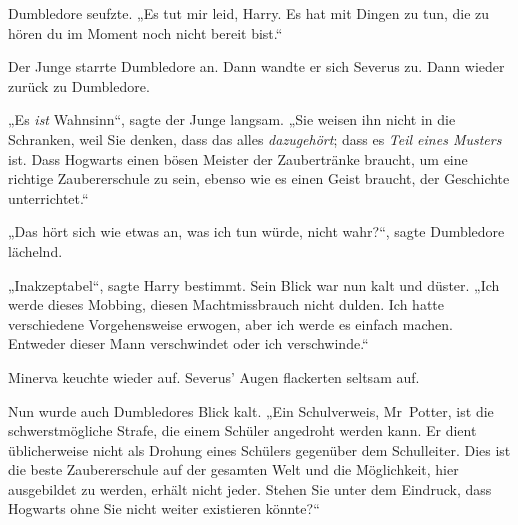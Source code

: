 Dumbledore seufzte. „Es tut mir leid, Harry. Es hat mit Dingen zu tun, die zu hören du im Moment noch nicht bereit bist.“

Der Junge starrte Dumbledore an. Dann wandte er sich Severus zu. Dann wieder zurück zu Dumbledore.

„Es \emph{ist} Wahnsinn“, sagte der Junge langsam. „Sie weisen ihn nicht in die Schranken, weil Sie denken, dass das alles \emph{dazugehört}; dass es \emph{Teil eines Musters} ist. Dass Hogwarts einen bösen Meister der Zaubertränke braucht, um eine richtige Zaubererschule zu sein, ebenso wie es einen Geist braucht, der Geschichte unterrichtet.“

„Das hört sich wie etwas an, was ich tun würde, nicht wahr?“, sagte Dumbledore lächelnd.

„Inakzeptabel“, sagte Harry bestimmt. Sein Blick war nun kalt und düster. „Ich werde dieses Mobbing, diesen Machtmissbrauch nicht dulden. Ich hatte verschiedene Vorgehensweise erwogen, aber ich werde es einfach machen. Entweder dieser Mann verschwindet oder ich verschwinde.“

Minerva keuchte wieder auf. Severus’ Augen flackerten seltsam auf.

Nun wurde auch Dumbledores Blick kalt. „Ein Schulverweis, Mr~Potter, ist die schwerstmögliche Strafe, die einem Schüler angedroht werden kann. Er dient üblicherweise nicht als Drohung eines Schülers gegenüber dem Schulleiter. Dies ist die beste Zaubererschule auf der gesamten Welt und die Möglichkeit, hier ausgebildet zu werden, erhält nicht jeder. Stehen Sie unter dem Eindruck, dass Hogwarts ohne Sie nicht weiter existieren könnte?“

